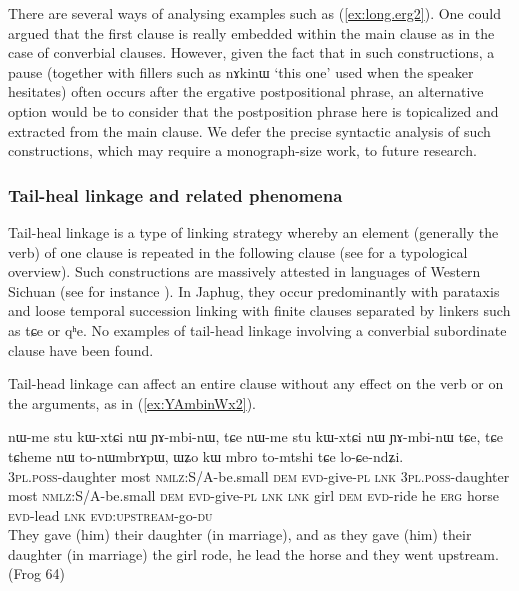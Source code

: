 \documentclass[oldfontcommands,oneside,a4paper,11pt]{article}
\newcommand{\ipa}[1]{{\phon \mbox{#1}}} %
\newcommand{\refb}[1]{(\ref{#1})}
\begin{document}
There are several ways of analysing examples such as \refb{ex:long.erg2}. One could argued that the first clause is really embedded within the main clause as in the case of converbial clauses. However, given the fact that in such constructions, a pause (together with fillers such as \ipa{nɤkinɯ} `this one' used when the speaker hesitates) often occurs after the ergative postpositional phrase, an alternative option would be to consider that the postposition phrase here is topicalized and extracted from the main clause. We defer the precise syntactic analysis of such constructions, which may require a monograph-size work, to future research.

\subsubsection{Tail-heal linkage and related phenomena}
Tail-heal linkage is a type of linking strategy whereby an element (generally the verb) of one clause  is repeated in the following clause (see \citealt{vries05tailhead} for a typological overview). Such constructions are massively attested in languages of Western Sichuan (see for instance \citealt[688-693]{zhangsh13ersu}). In Japhug, they occur predominantly with parataxis and loose temporal succession linking with finite clauses separated by linkers such as \ipa{tɕe} or \ipa{qʰe}. No examples of tail-head linkage involving a converbial subordinate clause have been found.

Tail-head linkage can affect an entire clause without any effect on the verb or on the arguments, as  in \refb{ex:YAmbinWx2}.

\begin{exe}
\ex \label{ex:YAmbinWx2}
\gll
\ipa{nɯ-me} 	\ipa{stu} 	\ipa{kɯ-xtɕi} 	\ipa{nɯ} 	\ipa{ɲɤ-mbi-nɯ,} 	\ipa{tɕe} 	\ipa{nɯ-me} 	\ipa{stu} 	\ipa{kɯ-xtɕi} 	\ipa{nɯ} 	\ipa{ɲɤ-mbi-nɯ} 	\ipa{tɕe,} 	\ipa{tɕe} 	\ipa{tɕheme} 	\ipa{nɯ} 	\ipa{to-nɯmbrɤpɯ,} 	\ipa{ɯʑo} 	\ipa{kɯ} 	\ipa{mbro} 	\ipa{to-mtshi} 	\ipa{tɕe} 	\ipa{lo-ɕe-ndʑi.} \\
\textsc{3pl.poss}-daughter most \textsc{nmlz}:S/A-be.small \textsc{dem} \textsc{evd}-give-\textsc{pl}  \textsc{lnk} \textsc{3pl.poss}-daughter most \textsc{nmlz}:S/A-be.small \textsc{dem} \textsc{evd}-give-\textsc{pl}  \textsc{lnk}  \textsc{lnk} girl \textsc{dem} \textsc{evd}-ride he \textsc{erg} horse \textsc{evd}-lead \textsc{lnk} \textsc{evd:upstream}-go-\textsc{du} \\
\glt They gave (him) their daughter (in marriage), and as they gave (him) their daughter (in marriage)  the girl rode, he lead the horse and they went upstream. (Frog 64)
\end{exe}
\end{document}
